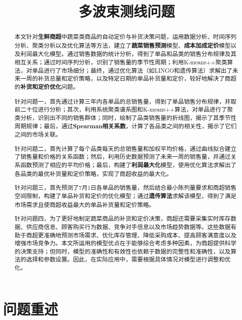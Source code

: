 \documentclass{cumcmthesis}
\title{多波束测线问题}
\begin{document}
 \maketitle
 \begin{abstract}
 	
本文针对\textbf{生鲜商超}中蔬菜类商品的自动定价与补货决策问题，运用数据分析、时间序列分析、聚类分析以及优化算法等方法，建立了\textbf{蔬菜销售预测}模型、\textbf{成本加成定价}模型以及利润最大化模型。通过销售数据的统计分析，得到了单品和品类的销售分布规律及其相互关系；通过时间序列分析，识别了销售量的季节性周期；利用K-means++聚类算法，对单品进行了市场细分；最终，通过优化算法（如LINGO和遗传算法）求解出了未来一周的补货总量和定价策略，以及特定日期的单品补货量和定价，较好地解决了商超的\textbf{补货和定价优化}问题。

针对问题一，首先通过计算三年内各单品的总销售量，得到了单品销售分布规律，并取前二十位进行分析；其次，利用系统聚类谱系图和K-means++算法，对单品进行了聚类分析，识别出不同的销售群体；同时，绘制了品类销售量的折线图，揭示了其季节性周期规律；最后，通过\textbf{Spearman相关系数}，计算了各品类之间的相关性，揭示了它们之间的市场关联。

针对问题二，首先计算了每个品类每天的总销售量和加权平均价格，通过曲线拟合建立了销售量和价格的关系函数；然后，利用历史数据预测了未来一周的销售量，并通过关系函数预测了相应的平均价格；最后，构建了\textbf{利润最大化}模型，使用优化算法求解出了各品类的最优补货量和定价策略，实现了商超收益的最大化。

针对问题三，首先预测了7月1日各单品的销售量，然后结合最小陈列量要求和商超销售空间限制，构建了单品补货和定价的优化模型；通过\textbf{遗传算法}求解该模型，得到了满足市场需求且使商超收益最大的单品补货量和定价策略。

针对问题四，为了更好地制定蔬菜商品的补货和定价决策，商超还需要采集实时库存数据、供应商信息、顾客购买行为数据、竞争对手信息以及市场趋势数据等。这些数据有助于商超更准确地预测市场需求、优化库存管理、降低采购成本、提高顾客满意度以及增强市场竞争力。本文所运用的模型优点在于能够综合考虑多种因素，为商超提供科学的决策支持；但同时，模型的准确性和有效性也依赖于数据的完整性和准确性，以及算法的选择和参数设置。因此，在实际应用中，需要根据具体情况对模型进行调整和优化。

\end{abstract}

\section{问题重述}
\end{document}
